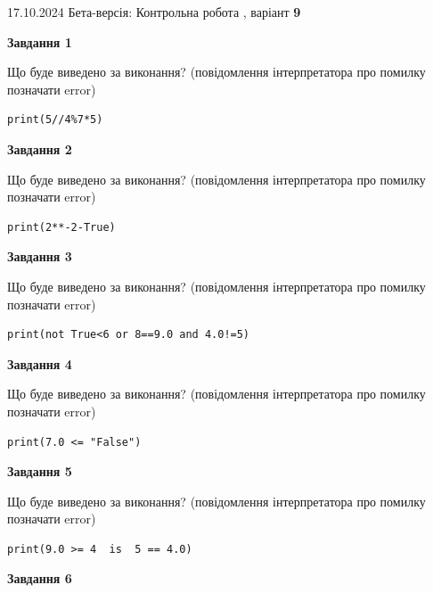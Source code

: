 \documentclass[12pt, ukrainian]{article}
\begin{document}
{\Large{17.10.2024 Бета-версія: Контрольна робота , варіант  \No \textbf { 9 }\par}}
{
\begin {large}
{\begin {center}\textbf{Завдання 1}\end {center}}

Що буде виведено за виконання? (повідомлення інтерпретатора про помилку позначати error)\par
\begin{verbatim}
print(5//4%7*5)
\end{verbatim}

{\begin {center}\textbf{Завдання 2}\end {center}}

Що буде виведено за виконання? (повідомлення інтерпретатора про помилку позначати error)\par
\begin{verbatim}
print(2**-2-True)
\end{verbatim}

{\begin {center}\textbf{Завдання 3}\end {center}}

Що буде виведено за виконання? (повідомлення інтерпретатора про помилку позначати error)\par
\begin{verbatim}
print(not True<6 or 8==9.0 and 4.0!=5)
\end{verbatim}

{\begin {center}\textbf{Завдання 4}\end {center}}

Що буде виведено за виконання? (повідомлення інтерпретатора про помилку позначати error)\par
\begin{verbatim}
print(7.0 <= "False")
\end{verbatim}

{\begin {center}\textbf{Завдання 5}\end {center}}

Що буде виведено за виконання? (повідомлення інтерпретатора про помилку позначати error)\par
\begin{verbatim}
print(9.0 >= 4  is  5 == 4.0)
\end{verbatim}

{\begin {center}\textbf{Завдання 6}\end {center}}


\end{large}}
\end{document}
